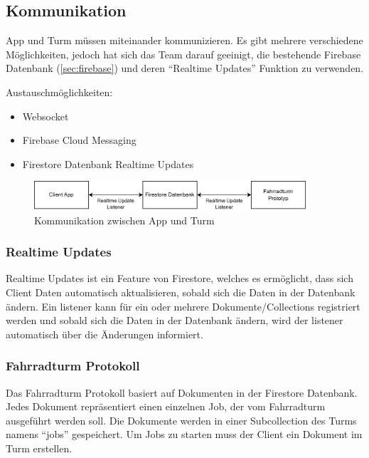 \subsection{Kommunikation}
\label{sec:kommunikation}

App und Turm müssen miteinander kommunizieren. Es gibt mehrere verschiedene Möglichkeiten, jedoch hat sich das Team darauf geeinigt, die bestehende Firebase Datenbank (\ref{sec:firebase}) und deren \enquote{Realtime Updates} Funktion zu verwenden.

Austauschmöglichkeiten:
\begin{itemize}
  \item Websocket
  \item Firebase Cloud Messaging
  \item Firestore Datenbank Realtime Updates
\end{itemize}

\begin{figure}[H]
  \centering
  \includegraphics[width=0.9\textwidth]{images/kommunikation.png}
  \caption{Kommunikation zwischen App und Turm}
  \label{fig:kommunikation}
\end{figure}

\subsubsection{Realtime Updates}

Realtime Updates ist ein Feature von Firestore, welches es ermöglicht, dass sich Client Daten automatisch aktualisieren, sobald sich die Daten in der Datenbank ändern. Ein \Gls{listener} kann für ein oder mehrere Dokumente/Collections registriert werden und sobald sich die Daten in der Datenbank ändern, wird der \Gls{listener} automatisch über die Änderungen informiert.

\subsubsection{Fahrradturm Protokoll}

Das Fahrradturm Protokoll basiert auf Dokumenten in der Firestore Datenbank. Jedes Dokument repräsentiert einen einzelnen Job, der vom Fahrradturm ausgeführt werden soll. Die Dokumente werden in einer Subcollection des Turms namens \enquote{jobs} gespeichert. Um Jobs zu starten muss der Client ein Dokument im Turm erstellen.

